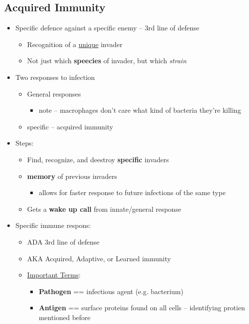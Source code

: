 \documentclass{article}
\theoremstyle{definition}
\begin{document}
\subsection{Acquired Immunity}
\begin{itemize}
	\item Specific defence against a specific enemy -- 3rd line of defense
		\begin{itemize}
			\item Recognition of a \underline{unique} invader
			\item Not just which \textbf{speecies}  of invader, but which \textit{strain} 
		\end{itemize}
	\item Two responses to infection
		\begin{itemize}
			\item  General responses
				\begin{itemize}
					\item note -- macrophages don't care what kind of bacteria they're killing
				\end{itemize}
			\item specific -- acquired immunity
		\end{itemize}
	\item Steps:
		\begin{itemize}
			\item Find, recognize, and deestroy \textbf{specific} invaders
			\item \textbf{memory} of previous invaders
				\begin{itemize}
					\item allows for faster response to future infections of the same type
				\end{itemize}
			\item Gets a \textbf{wake up call} from innate/general response
		\end{itemize}
	\item Specific immune respons:
		\begin{itemize}
			\item ADA 3rd line of defense
			\item AKA Acquired, Adaptive, or Learned immunity
			\item \underline{Important Terms}:
				\begin{itemize}
					\item \textbf{Pathogen}  == infectious agent (e.g. bacterium)
					\item \textbf{Antigen}  == surface proteins found on all cells -- identifying protien mentioned before

\end{itemize}
\end{itemize}
\end{itemize}
\end{document}
